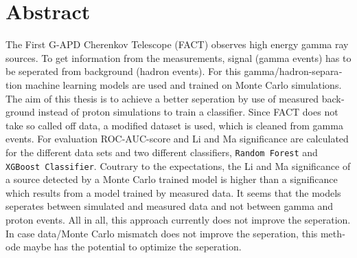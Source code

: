 \section*{Abstract}
\begin{english}
The First G-APD Cherenkov Telescope (FACT) observes high energy gamma ray sources. 
To get information from the measurements, signal (gamma events) has to be seperated from background (hadron events).
For this gamma/hadron-separation machine learning models are used and trained on Monte Carlo simulations.
The aim of this thesis is to achieve a better seperation by use of measured background instead of proton simulations to train a classifier.
Since FACT does not take so called off data, a modified dataset is used, which is cleaned from gamma events.
For evaluation ROC-AUC-score and Li and Ma significance are calculated for the different data sets and two different classifiers, \texttt{Random Forest} and \texttt{XGBoost Classifier}.
Coutrary to the expectations, the Li and Ma significance of a source detected by a Monte Carlo trained model is higher than a significance which results from a model trained by measured data.
It seems that the models seperates between simulated and measured data and not between gamma and proton events.
All in all, this approach currently does not improve the seperation.
In case data/Monte Carlo mismatch does not improve the seperation, this methode maybe has the potential to optimize the seperation.
\end{english}
